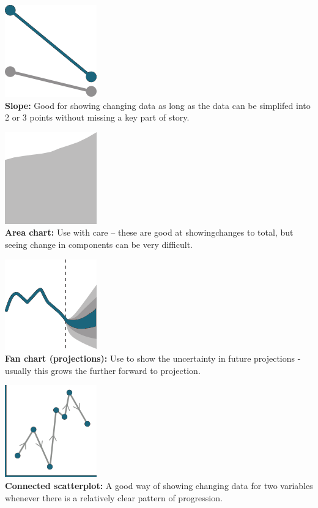 \documentclass[
  a4paper,
  onecolumn,
  oneside]{book}
\begin{document}
\includegraphics{part1/images/changeovertime4.png}\\
\textbf{Slope:} Good for showing changing data as long as the data can
be simplifed into 2 or 3 points without missing a key part of story.

\includegraphics{part1/images/changeovertime5.png}\\
\textbf{Area chart:} Use with care -- these are good at showingchanges
to total, but seeing change in components can be very difficult.

\includegraphics{part1/images/changeovertime6.png}\\
\textbf{Fan chart (projections):} Use to show the uncertainty in future
projections - usually this grows the further forward to projection.

\includegraphics{part1/images/changeovertime7.png}\\
\textbf{Connected scatterplot:} A good way of showing changing data for
two variables whenever there is a relatively clear pattern of
progression.
\end{document}
